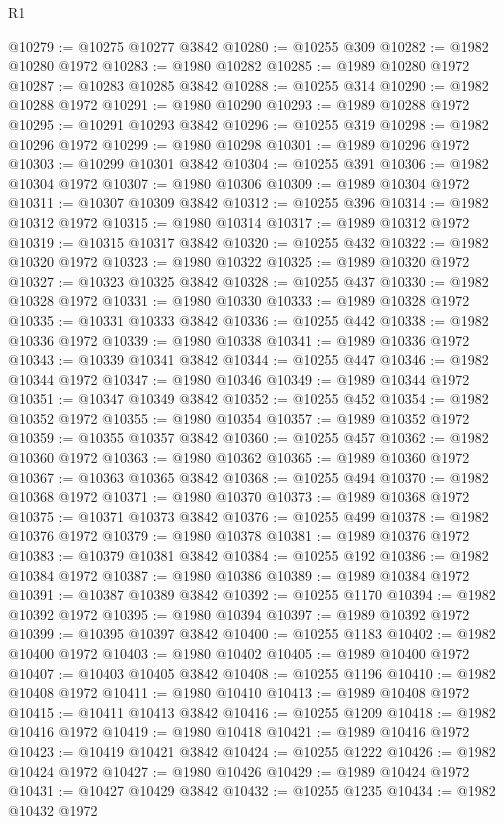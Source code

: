 \begin{lexlean}{R1}
\begin{coremodule}
@10279 := @10275 @10277 @3842
@10280 := @10255 @309
@10282 := @1982 @10280 @1972
@10283 := @1980 @10282
@10285 := @1989 @10280 @1972
@10287 := @10283 @10285 @3842
@10288 := @10255 @314
@10290 := @1982 @10288 @1972
@10291 := @1980 @10290
@10293 := @1989 @10288 @1972
@10295 := @10291 @10293 @3842
@10296 := @10255 @319
@10298 := @1982 @10296 @1972
@10299 := @1980 @10298
@10301 := @1989 @10296 @1972
@10303 := @10299 @10301 @3842
@10304 := @10255 @391
@10306 := @1982 @10304 @1972
@10307 := @1980 @10306
@10309 := @1989 @10304 @1972
@10311 := @10307 @10309 @3842
@10312 := @10255 @396
@10314 := @1982 @10312 @1972
@10315 := @1980 @10314
@10317 := @1989 @10312 @1972
@10319 := @10315 @10317 @3842
@10320 := @10255 @432
@10322 := @1982 @10320 @1972
@10323 := @1980 @10322
@10325 := @1989 @10320 @1972
@10327 := @10323 @10325 @3842
@10328 := @10255 @437
@10330 := @1982 @10328 @1972
@10331 := @1980 @10330
@10333 := @1989 @10328 @1972
@10335 := @10331 @10333 @3842
@10336 := @10255 @442
@10338 := @1982 @10336 @1972
@10339 := @1980 @10338
@10341 := @1989 @10336 @1972
@10343 := @10339 @10341 @3842
@10344 := @10255 @447
@10346 := @1982 @10344 @1972
@10347 := @1980 @10346
@10349 := @1989 @10344 @1972
@10351 := @10347 @10349 @3842
@10352 := @10255 @452
@10354 := @1982 @10352 @1972
@10355 := @1980 @10354
@10357 := @1989 @10352 @1972
@10359 := @10355 @10357 @3842
@10360 := @10255 @457
@10362 := @1982 @10360 @1972
@10363 := @1980 @10362
@10365 := @1989 @10360 @1972
@10367 := @10363 @10365 @3842
@10368 := @10255 @494
@10370 := @1982 @10368 @1972
@10371 := @1980 @10370
@10373 := @1989 @10368 @1972
@10375 := @10371 @10373 @3842
@10376 := @10255 @499
@10378 := @1982 @10376 @1972
@10379 := @1980 @10378
@10381 := @1989 @10376 @1972
@10383 := @10379 @10381 @3842
@10384 := @10255 @192
@10386 := @1982 @10384 @1972
@10387 := @1980 @10386
@10389 := @1989 @10384 @1972
@10391 := @10387 @10389 @3842
@10392 := @10255 @1170
@10394 := @1982 @10392 @1972
@10395 := @1980 @10394
@10397 := @1989 @10392 @1972
@10399 := @10395 @10397 @3842
@10400 := @10255 @1183
@10402 := @1982 @10400 @1972
@10403 := @1980 @10402
@10405 := @1989 @10400 @1972
@10407 := @10403 @10405 @3842
@10408 := @10255 @1196
@10410 := @1982 @10408 @1972
@10411 := @1980 @10410
@10413 := @1989 @10408 @1972
@10415 := @10411 @10413 @3842
@10416 := @10255 @1209
@10418 := @1982 @10416 @1972
@10419 := @1980 @10418
@10421 := @1989 @10416 @1972
@10423 := @10419 @10421 @3842
@10424 := @10255 @1222
@10426 := @1982 @10424 @1972
@10427 := @1980 @10426
@10429 := @1989 @10424 @1972
@10431 := @10427 @10429 @3842
@10432 := @10255 @1235
@10434 := @1982 @10432 @1972

\end{coremodule}
\end{lexlean}
